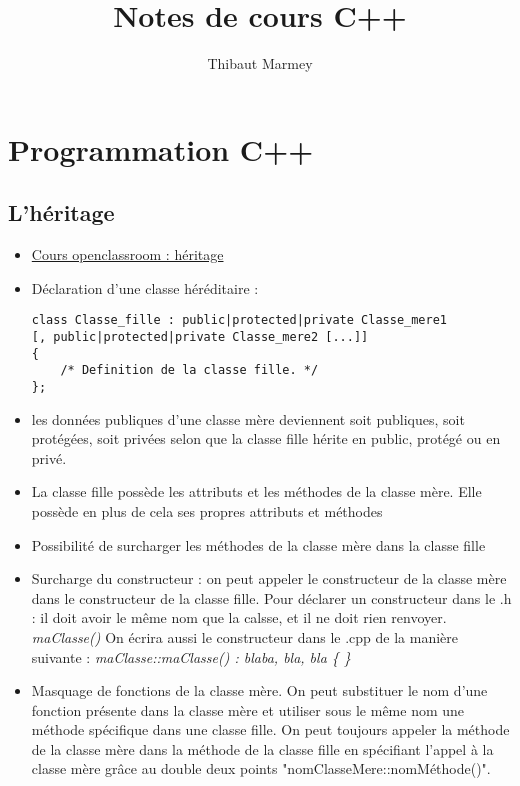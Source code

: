 \documentclass[12pt,a4paper]{article}
\author{Thibaut Marmey}
\title{Notes de cours C++}
\begin{document}
	\maketitle

\begin{normalsize}
\tableofcontents
\end{normalsize}

\section{Programmation C++}
\subsection{L'héritage}
\begin{itemize}
\item \href{https://openclassrooms.com/fr/courses/1894236-programmez-avec-le-langage-c/1898475-lheritage}{Cours openclassroom : héritage}
\item Déclaration d'une classe héréditaire : 
\begin{lstlisting}
class Classe_fille : public|protected|private Classe_mere1
[, public|protected|private Classe_mere2 [...]]
{
    /* Definition de la classe fille. */
};
\end{lstlisting}
\item les données publiques d'une classe mère deviennent soit publiques, soit protégées, soit privées selon que la classe fille hérite en public, protégé ou en privé.
\item La classe fille possède les attributs et les méthodes de la classe mère. Elle possède en plus de cela ses propres attributs et méthodes
\item Possibilité de surcharger les méthodes de la classe mère dans la classe fille
\item Surcharge du constructeur : on peut appeler le constructeur de la classe mère dans le constructeur de la classe fille.
\newline Pour déclarer un constructeur dans le .h : il doit avoir le même nom que la calsse, et il ne doit rien renvoyer. \textit{maClasse()}
\newline On écrira aussi le constructeur dans le .cpp de la manière suivante : 
\newline \textit{maClasse::maClasse() : blaba, bla, bla \{ \}}
\item Masquage de fonctions de la classe mère. On peut substituer le nom d'une fonction présente dans la classe mère et utiliser sous le même nom une méthode spécifique dans une classe fille. On peut toujours appeler la méthode de la classe mère dans la méthode de la classe fille en spécifiant l'appel à la classe mère grâce au double deux points "nomClasseMere::nomMéthode()".

\end{itemize}
\end{document}
